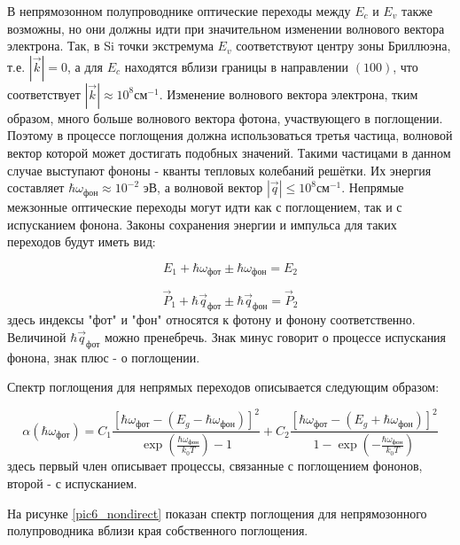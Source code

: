 В непрямозонном полупроводнике оптические переходы между $E_{c}$ и $E_{v}$ также возможны, но они должны идти при значительном изменении волнового вектора электрона. Так, в Si точки экстремума $E_{v}$ соответствуют центру зоны Бриллюэна, т.е. $|\overrightarrow{k}| = 0$, а для $E_{c}$ находятся вблизи границы в направлении $(100)$, что соответствует $|\overrightarrow{k}| \approx 10^8 \text{см}^{-1}$. Изменение волнового вектора электрона, тким образом, много больше волнового вектора фотона, участвующего в поглощении. Поэтому в процессе поглощения должна использоваться третья частица, волновой вектор которой может достигать подобных значений. Такими частицами в данном случае выступают фононы - кванты тепловых колебаний решётки. Их энергия составляет $\hbar \omega_{\text{фон}} \approx 10^{-2}$ эВ, а волновой вектор $|\overrightarrow{q}| \le 10^{8} \text{см}^{-1}$. Непрямые межзонные оптические переходы могут идти как с поглощением, так и с испусканием фонона. Законы сохранения энергии и импульса для таких переходов будут иметь вид:

\begin{equation}
E_{1} + \hbar \omega_{\text{фот}} \pm \hbar \omega_{\text{фон}} = E_{2}
\end{equation}

\begin{equation}
\overrightarrow{P}_{1} + \hbar \overrightarrow{q}_{\text{фот}} \pm \hbar \overrightarrow{q}_{\text{фон}} = \overrightarrow{P}_{2}
\end{equation}
здесь индексы "фот" и "фон" относятся к фотону и фонону соответственно. Величиной $\hbar \overrightarrow{q}_{\text{фот}}$ можно пренебречь. Знак минус говорит о процессе испускания фонона, знак плюс - о поглощении.

Спектр поглощения для непрямых переходов описывается следующим образом:

\begin{equation}
\alpha(\hbar \omega_{\text{фот}}) =
C_{1} \frac{\left[ \hbar \omega_{\text{фот}} - (E_{g}-\hbar \omega_{\text{фон}}) \right]^{2}}{\exp \left( \frac{\hbar \omega_{\text{фон}}}{k_{0} T} \right) - 1} +
C_{2} \frac{\left[ \hbar \omega_{\text{фот}} - (E_{g}+\hbar \omega_{\text{фон}}) \right]^{2}}{1 - \exp \left( -\frac{\hbar \omega_{\text{фон}}}{k_{0} T} \right)}
\end{equation}
здесь первый член описывает процессы, связанные с поглощением фононов, второй - с испусканием.

На рисунке \ref{pic6_nondirect} показан спектр поглощения для непрямозонного полупроводника вблизи края собственного поглощения.

